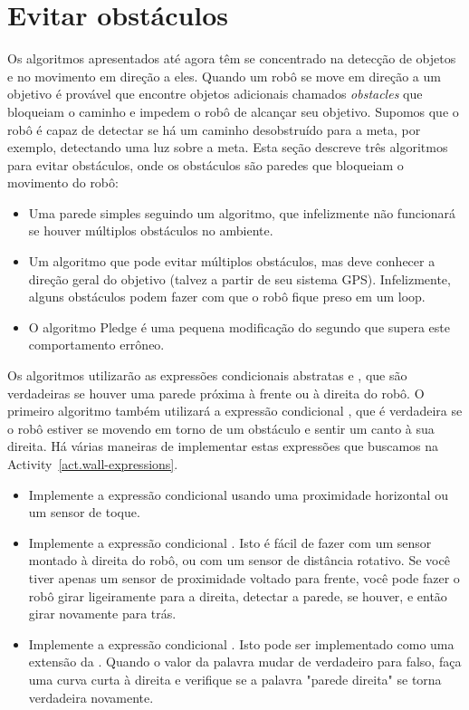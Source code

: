 \section{Evitar obstáculos}\label{s.obstacle-avoidance}

Os algoritmos apresentados até agora têm se concentrado na detecção de objetos e no movimento em direção a eles. Quando um robô se move em direção a um objetivo é provável que encontre objetos adicionais chamados \emph{obstacles} que bloqueiam o caminho e impedem o robô de alcançar seu objetivo. Supomos que o robô é capaz de detectar se há um caminho desobstruído para a meta, por exemplo, detectando uma luz sobre a meta. Esta seção descreve três algoritmos para evitar obstáculos, onde os obstáculos são paredes que bloqueiam o movimento do robô:
\begin{itemize}
\item Uma parede simples seguindo um algoritmo, que infelizmente não funcionará se houver múltiplos obstáculos no ambiente.
\item Um algoritmo que pode evitar múltiplos obstáculos, mas deve conhecer a direção geral do objetivo (talvez a partir de seu sistema GPS). Infelizmente, alguns obstáculos podem fazer com que o robô fique preso em um loop.
\item O algoritmo Pledge é uma pequena modificação do segundo que supera este comportamento errôneo.
\end{itemize}
Os algoritmos utilizarão as expressões condicionais abstratas  e , que são verdadeiras se houver uma parede próxima à frente ou à direita do robô. O primeiro algoritmo também utilizará a expressão condicional , que é verdadeira se o robô estiver se movendo em torno de um obstáculo e sentir um canto à sua direita. Há várias maneiras de implementar estas expressões que buscamos na Activity~\ref{act.wall-expressions}.

\begin{framed}
\begin{itemize}
\item Implemente a expressão condicional  usando uma proximidade horizontal ou um sensor de toque.
\item Implemente a expressão condicional . Isto é fácil de fazer com um sensor montado à direita do robô, ou com um sensor de distância rotativo. Se você tiver apenas um sensor de proximidade voltado para frente, você pode fazer o robô girar ligeiramente para a direita, detectar a parede, se houver, e então girar novamente para trás.
\item Implemente a expressão condicional . Isto pode ser implementado como uma extensão da . Quando o valor da palavra  mudar de verdadeiro para falso, faça uma curva curta à direita e verifique se a palavra "parede direita" se torna verdadeira novamente.
\end{itemize}
\end{framed}

